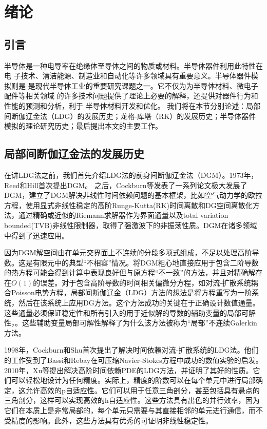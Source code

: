 \cleardoublepage

\section{绪论}

\subsection{引言}
半导体是一种电导率在绝缘体至导体之间的物质或材料。半导体器件利用此特性在电
子技术、清洁能源、制造业和自动化等许多领域具有重要意义。半导体器件模拟则是
是现代半导体工业的重要研究课题之一。它不仅为为半导体材料、微电子配件等相关领域
的许多技术问题提供了理论上必要的解释，还提供对器件行为和性能的预测和分析，利于
半导体材料开发和优化。
我们将在本节分别论述：局部间断伽辽金法（LDG）的发展历史；龙格-库塔（RK）的发展历史；半导体器件模拟的理论研究历史；最后提出本文的主要工作。
\subsection{局部间断伽辽金法的发展历史}
在讲LDG法之前，我们首先介绍LDG法的前身间断伽辽金法（DGM）。1973年，Reed和Hill首次提出DGM\cite{reed1973triangular}。
之后，Cockburn等发表了一系列论文极大发展了DGM，建立了DGM解决非线性时间依赖问题的基本框架\cite{reed1973triangular,cockburn1991runge,cockburn1989tvb2,cockburn1989tvb3,cockburn1990runge,cockburn1998runge}，比如空气动力学的欧拉方程，使用显式非线性稳定的高阶Runge-Kutta(RK)时间离散和DG空间离散化方法，通过精确或近似的Riemann求解器作为界面通量以及total variation bounded(TVB)非线性限制器，取得了强激波下的非振荡性质。DGM在诸多领域中得到了迅速应用\cite{cockburn2000development}。

因为DGM解空间由在单元交界面上不连续的分段多项式组成，不足以处理高阶导数。这是有限元中的典型“不相容”情况。将DGM粗心地直接应用于包含二阶导数的热方程可能会得到计算中表现良好但与原方程“不一致”的方法，并且对精确解存在$O(1)$的误差\cite{cockburn2001runge,zhang2003analysis}。对于包含高阶导数的时间相关偏微分方程，如对流-扩散系统耦合Poisson电势方程，局部间断伽辽金（LDG）方法的想法是将方程重写为一阶系统，然后在该系统上应用DG方法。这个方法成功的关键在于正确设计数值通量。这些通量必须保证稳定性和所有引入的用于近似解的导数的辅助变量的局部可解性，。这些辅助变量局部可解性解释了为什么该方法被称为“局部”不连续Galerkin方法\cite{cockburn1998local}。

1998年，Cockburn和Shu首次提出了解决时间依赖对流-扩散系统的LDG法\cite{cockburn1998local}。他们的工作受到了Bassi和Rebay在可压缩Navier-Stokes方程中成功的数值实验的启发\cite{bassi1997high}。2010年，Xu等提出解决高阶时间依赖PDE的LDG方法\cite{xu2010local}，并证明了其好的性质。它们可以轻松地设计为任何精度。实际上，精度的阶数可以在每个单元中进行局部确定，这允许高效的p自适应性。它们可以用于任意三角剖分，甚至包括具有悬点的三角剖分，这样可以实现高效的h自适应性。这些方法具有出色的并行效率，因为它们在本质上是非常局部的，每个单元只需要与其直接相邻的单元进行通信，而不受精度的影响。此外，这些方法具有优秀的可证明非线性稳定性。
